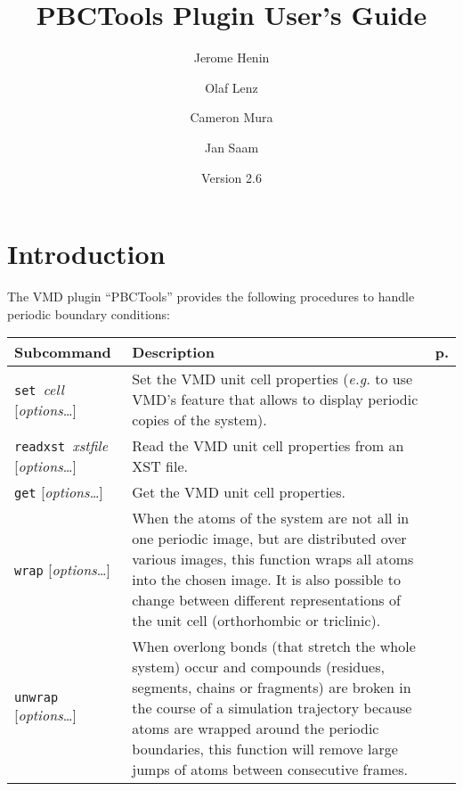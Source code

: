 \documentclass[a4paper, DIV12]{scrartcl}
\newcommand{\eg}{\emph{e.g.}\xspace}
\newcommand{\pbctools}{PBCTools\xspace}
\begin{document}
\title{\pbctools Plugin User's Guide}
\author{Jerome Henin \and Olaf Lenz \and Cameron Mura \and Jan Saam}
\date{Version 2.6}

\maketitle

\section{Introduction}
The VMD plugin ``\pbctools'' provides the following procedures to
handle periodic boundary conditions:

\begin{center}
  \begin{tabular}{|p{}|p{}|r|}
    \hline
    \textbf{Subcommand} & \textbf{Description} & \textbf{p.}\\\hline\hline
  
    \mbox{\texttt{set} \textit{cell}} [\textit{options}\dots]
    & Set the VMD unit cell properties (\eg to use VMD's feature that
    allows to display periodic copies of the system). 
    & \pageref{sec:set}
    \\\hline
  
    \mbox{\texttt{readxst} \textit{xstfile}} [\textit{options}\dots]
    & Read the VMD unit cell properties from an XST file.
    & \pageref{sec:readxst} 
    \\\hline
  
    \texttt{get} [\textit{options}\dots]
    & Get the VMD unit cell properties. 
    & \pageref{sec:get}
    \\\hline
  
    \texttt{wrap} [\textit{options}\dots]
    & When the atoms of the system are not all in one periodic image,
    but are distributed over various images, this function wraps all
    atoms into the chosen image. It is also possible to change between
    different representations of the unit cell (orthorhombic or triclinic).
    & \pageref{sec:wrap}
    \\\hline
  
    \texttt{unwrap} [\textit{options}\dots]
    & When overlong bonds (that stretch the whole system) occur and
    compounds (residues, segments, chains or fragments) are broken in
    the course of a simulation trajectory because atoms are wrapped
    around the periodic boundaries, this function will remove large
    jumps of atoms between consecutive frames.
    & \pageref{sec:unwrap}
    \\\hline
  

\end{tabular}
\end{center}
\end{document}
